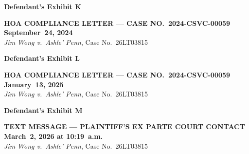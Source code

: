 \documentclass[10pt,letterpaper,oneside]{extarticle}
\begin{document}
\newpage
{}
\begin{flushleft}
	\textbf{\large Defendant's Exhibit K}
\end{flushleft}
\begin{center}
	\textbf{HOA COMPLIANCE LETTER ---
		CASE NO.\ 2024-CSVC-00059}\\[2pt]
	\textbf{September~24, 2024}\\[4pt]
	\textit{Jim Wong v.\ Ashle' Penn},
	Case No.\ 26LT03815
\end{center}
\vspace{0.5em}

\newpage
{}
\begin{flushleft}
	\textbf{\large Defendant's Exhibit L}
\end{flushleft}
\begin{center}
	\textbf{HOA COMPLIANCE LETTER ---
		CASE NO.\ 2024-CSVC-00059}\\[2pt]
	\textbf{January~13, 2025}\\[4pt]
	\textit{Jim Wong v.\ Ashle' Penn},
	Case No.\ 26LT03815
\end{center}
\vspace{0.5em}

\newpage
{}
\begin{flushleft}
	\textbf{\large Defendant's Exhibit M}
\end{flushleft}
\begin{center}
	\textbf{TEXT MESSAGE --- PLAINTIFF'S EX PARTE
		COURT CONTACT}\\[2pt]
	\textbf{March~2, 2026 at 10:19~a.m.}\\[4pt]
	\textit{Jim Wong v.\ Ashle' Penn},
	Case No.\ 26LT03815
\end{center}
\end{document}
